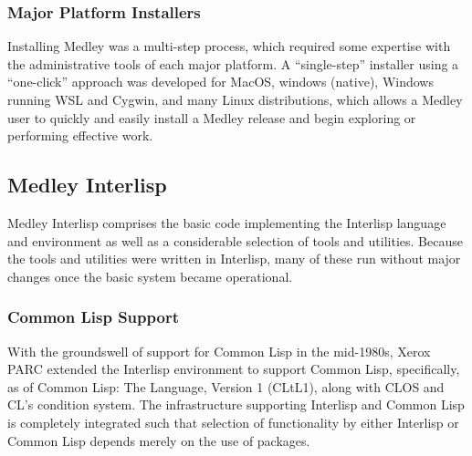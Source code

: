 \documentclass[sigconf]{acmart}
\begin{document}



\subsubsection{Major Platform Installers}

Installing Medley was a multi-step process, which required some expertise with the administrative tools of each major platform. A ``single-step'' installer using a ``one-click'' approach was developed for MacOS, windows (native), Windows running WSL and Cygwin, and many Linux distributions, which allows a Medley user to quickly and easily install a Medley release and begin exploring or performing effective work.

\subsection{Medley Interlisp}

Medley Interlisp comprises the basic code implementing the Interlisp language and environment as well as a considerable selection of tools and utilities. Because the tools and utilities were written in Interlisp, many of these run without major changes once the basic system became operational.

\subsubsection{Common Lisp Support}

With the groundswell of support for Common Lisp in the mid-1980s, Xerox PARC extended the Interlisp environment to support Common Lisp, specifically, as of Common Lisp: The Language, Version 1 (CLtL1), along with CLOS and CL's condition system. The infrastructure supporting Interlisp and Common Lisp is completely integrated such that selection of functionality by either Interlisp or Common Lisp depends merely on the use of packages.

\end{document}
